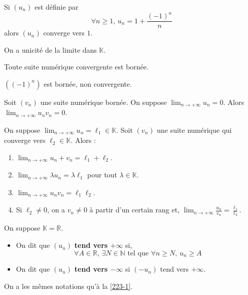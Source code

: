   \begin{example}
    Si $(u_n)$ est définie par
    \[ \forall n \geq 1, \, u_n = 1 + \frac{(-1)^n}{n} \]
    alors $(u_n)$ converge vers $1$.
  \end{example}

  \begin{theorem}
    On a unicité de la limite dans $\mathbb{K}$.
  \end{theorem}

  \begin{proposition}
    Toute suite numérique convergente est bornée.
  \end{proposition}

  \begin{cexample}
    $((-1)^n)$ est bornée, non convergente.
  \end{cexample}

  \begin{proposition}
    Soit $(v_n)$ une suite numérique bornée. On suppose $\lim_{n \rightarrow +\infty} u_n = 0$. Alors $\lim_{n \rightarrow +\infty} u_n v_n = 0$.
  \end{proposition}

  \begin{proposition}
    On suppose $\lim_{n \rightarrow +\infty} u_n = \ell_1 \in \mathbb{K}$. Soit $(v_n)$ une suite numérique qui converge vers $\ell_2 \in \mathbb{K}$. Alors :
    \begin{enumerate}[label=(\roman*)]
      \item $\lim_{n \rightarrow +\infty} u_n + v_n = \ell_1 + \ell_2$.
      \item $\lim_{n \rightarrow +\infty} \lambda u_n = \lambda \ell_1$ pour tout $\lambda \in \mathbb{K}$.
      \item $\lim_{n \rightarrow +\infty} u_n v_n = \ell_1 \ell_2$.
      \item Si $\ell_2 \neq 0$, on a $v_n \neq 0$ à partir d'un certain rang et, $\lim_{n \rightarrow +\infty} \frac{u_n}{v_n} = \frac{\ell_1}{\ell_2}$.
    \end{enumerate}
  \end{proposition}


  \begin{definition}
    On suppose $\mathbb{K} = \mathbb{R}$.
    \begin{itemize}
      \item On dit que $(u_n)$ \textbf{tend vers $+\infty$} si,
      \[ \forall A \in \mathbb{R}, \, \exists N \in \mathbb{N} \text{ tel que } \forall n \geq N, \, u_n \geq A \]
      \item On dit que $(u_n)$ \textbf{tend vers $-\infty$} si $(-u_n)$ tend vers $+\infty$.
    \end{itemize}
    On a les mêmes notations qu'à la \cref{223-1}.
  \end{definition}


